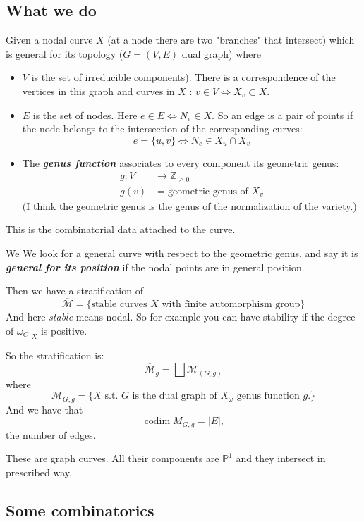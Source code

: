 \subsection{What we do}
Given a nodal curve $X$ (at a node there are two "branches" that intersect) which is general for its topology ($G=(V,E)$ dual graph) where
 \begin{itemize}
\item $V$ is the set of irreducible components). There is a correspondence of the vertices in this graph and curves in $X$ : $v\in V\iff X_v \subset X$.
\item $E$ is the set of nodes. Here $e \in E\iff N_e\in X$. So an edge is a pair of points if the node belongs to the intersection of the corresponding curves:
	\[e=\{u,v\} \iff N_e\in X_u\cap X_v\]
\item The \textit{\textbf{genus function}} associates to every component its geometric genus:
	 \begin{align*}
		g: V &\longrightarrow \mathbb{Z}_{\geq 0} \\
		g(v) &=\text{geometric genus of }X_v  
	\end{align*}
	(I think the geometric genus is the genus of the normalization of the variety.)	
\end{itemize}
This is the combinatorial data attached to the curve.

We 
We look for a general curve with respect to the geometric genus, and say it is \textit{\textbf{general for its position}} if the nodal points are in general position.

Then we have a stratification of 
\[\overline{\mathcal{M}}=\{\text{stable curves } X \text{ with finite automorphism group}  \}\]
And here \textit{stable} means nodal. So for example you can have stability if the degree of $\omega_C|_{X}$ is positive.

So the stratification is:
\[\overline{\mathcal{M}}_{g}=\bigsqcup \mathcal{M}_{(G,g)}\]
where
\[\mathcal{M}_{G,g}=\{X\text{ s.t. $G$ is the dual graph of $X_\omega$ genus function $g$.} \}\]
And we have that
\[ \operatorname{codim}M_{G,g}=|E|,\]
the number of edges.

\begin{remark}
	These are graph curves. All their components are $\mathbb{P}^1$ and they intersect in prescribed way.
\end{remark}

\subsection{Some combinatorics}

